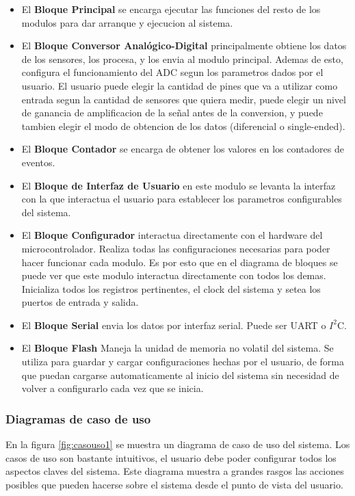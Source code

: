 \begin{itemize}
  \item El \textbf{Bloque Principal} se encarga ejecutar las funciones del resto de los modulos para dar arranque y ejecucion al sistema.
  \item El \textbf{Bloque Conversor Anal\'ogico-Digital} principalmente obtiene los datos de los sensores, los procesa, y los envia al modulo principal. Ademas de esto, configura el funcionamiento del ADC segun los parametros dados por el usuario. El usuario puede elegir la cantidad de pines que va a utilizar como entrada segun la cantidad de sensores que quiera medir, puede elegir un nivel de ganancia de amplificacion de la se\~nal antes de la conversion, y puede tambien elegir el modo de obtencion de los datos (diferencial o single-ended).
  \item El \textbf{Bloque Contador} se encarga de obtener los valores en los contadores de eventos.
  \item El \textbf{Bloque de Interfaz de Usuario} en este modulo se levanta la interfaz con la que interactua el usuario para establecer los parametros configurables del sistema.
  \item El \textbf{Bloque Configurador} interactua directamente con el hardware del microcontrolador. Realiza todas las configuraciones necesarias para poder hacer funcionar cada modulo. Es por esto que en el diagrama de bloques se puede ver que este modulo interactua directamente con todos los demas. Inicializa todos los registros pertinentes, el clock del sistema y setea los puertos de entrada y salida.
  \item El \textbf{Bloque Serial} envia los datos por interfaz serial. Puede ser UART o $I^{2}$C.
  \item El \textbf{Bloque Flash} Maneja la unidad de memoria no volatil del sistema. Se utiliza para guardar y cargar configuraciones hechas por el usuario, de forma que puedan cargarse automaticamente al inicio del sistema sin necesidad de volver a configurarlo cada vez que se inicia.
\end{itemize}


\subsubsection{Diagramas de caso de uso} %
\label{ssub:diagramas_de_caso_de_uso}

En la figura \ref{fig:casouso1} se muestra un diagrama de caso de uso del sistema. Los casos de uso son bastante intuitivos, el usuario debe poder configurar todos los aspectos claves del sistema. Este diagrama muestra a grandes rasgos las acciones posibles que pueden hacerse sobre el sistema desde el punto de vista del usuario.

